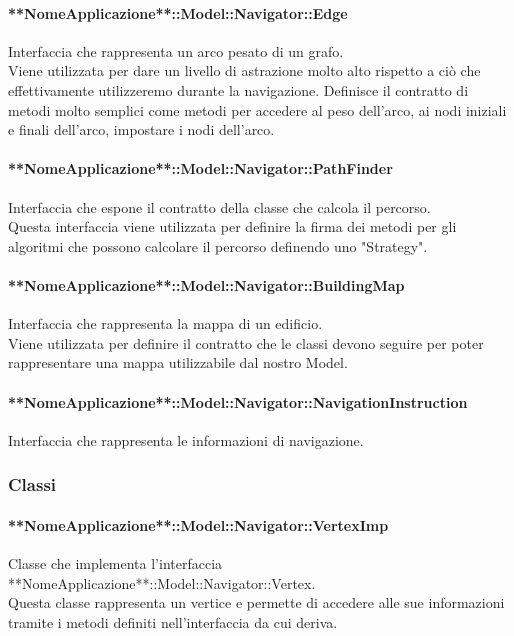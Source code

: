 \documentclass[../SpecificaTecnica.tex]{subfiles}
\begin{document}
				\paragraph{**NomeApplicazione**::Model::Navigator::Edge}
					Interfaccia che rappresenta un arco pesato di un grafo. \\ 
					Viene utilizzata per dare un livello di astrazione molto alto rispetto a ciò che effettivamente utilizzeremo durante la navigazione. Definisce il contratto di metodi molto semplici come metodi per accedere al peso dell'arco, ai nodi iniziali e finali dell'arco, impostare i nodi dell'arco.
				\paragraph{**NomeApplicazione**::Model::Navigator::PathFinder}
					Interfaccia che espone il contratto della classe che calcola il percorso. \\ 
					Questa interfaccia viene utilizzata per definire la firma dei metodi per gli algoritmi che possono calcolare il percorso definendo uno "Strategy".
				\paragraph{**NomeApplicazione**::Model::Navigator::BuildingMap}
					Interfaccia che rappresenta la mappa di un edificio. \\
					Viene utilizzata per definire il contratto che le classi devono seguire per poter rappresentare una mappa utilizzabile dal nostro Model.
				\paragraph{**NomeApplicazione**::Model::Navigator::NavigationInstruction}
					Interfaccia che rappresenta le informazioni di navigazione. \\
			\subsubsection{Classi}
				\paragraph{**NomeApplicazione**::Model::Navigator::VertexImp}
					Classe che implementa l'interfaccia **NomeApplicazione**::Model::Navigator::Vertex. \\
					Questa classe rappresenta un vertice e permette di accedere alle sue informazioni tramite i metodi definiti nell'interfaccia da cui deriva.
\end{document}
